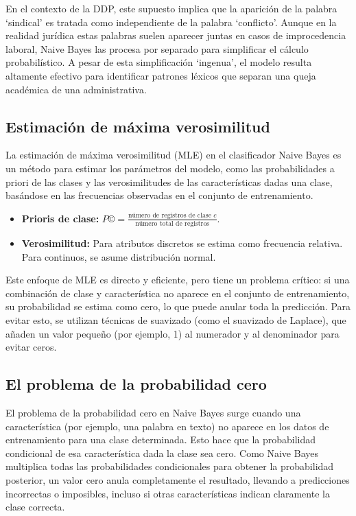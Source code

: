 En el contexto de la DDP, este supuesto implica que la aparición de la palabra ‘sindical’ es tratada como independiente de la palabra ‘conflicto’. Aunque en la realidad jurídica estas palabras suelen aparecer juntas en casos de improcedencia laboral, Naive Bayes las procesa por separado para simplificar el cálculo probabilístico. A pesar de esta simplificación ‘ingenua’, el modelo resulta altamente efectivo para identificar patrones léxicos que separan una queja académica de una administrativa.

\subsection{Estimación de máxima verosimilitud}

La estimación de máxima verosimilitud (MLE) en el clasificador Naive Bayes es un método para estimar los parámetros del modelo, como las probabilidades a priori de las clases y las verosimilitudes de las características dadas una clase, basándose en las frecuencias observadas en el conjunto de entrenamiento.
\begin{itemize}
\item \textbf{Prioris de clase:} $P© = \frac{\text{número de registros de clase } c}{\text{número total de registros}}$.
\item \textbf{Verosimilitud:} Para atributos discretos se estima como frecuencia relativa. Para continuos, se asume distribución normal.
\end{itemize}

Este enfoque de MLE es directo y eficiente, pero tiene un problema crítico: si una combinación de clase y característica no aparece en el conjunto de entrenamiento, su probabilidad se estima como cero, lo que puede anular toda la predicción. Para evitar esto, se utilizan técnicas de suavizado (como el suavizado de Laplace), que añaden un valor pequeño (por ejemplo, 1) al numerador y al denominador para evitar ceros.

\subsection{El problema de la probabilidad cero}

El problema de la probabilidad cero en Naive Bayes surge cuando una característica (por ejemplo, una palabra en texto) no aparece en los datos de entrenamiento para una clase determinada. Esto hace que la probabilidad condicional de esa característica dada la clase sea cero. Como Naive Bayes multiplica todas las probabilidades condicionales para obtener la probabilidad posterior, un valor cero anula completamente el resultado, llevando a predicciones incorrectas o imposibles, incluso si otras características indican claramente la clase correcta.


